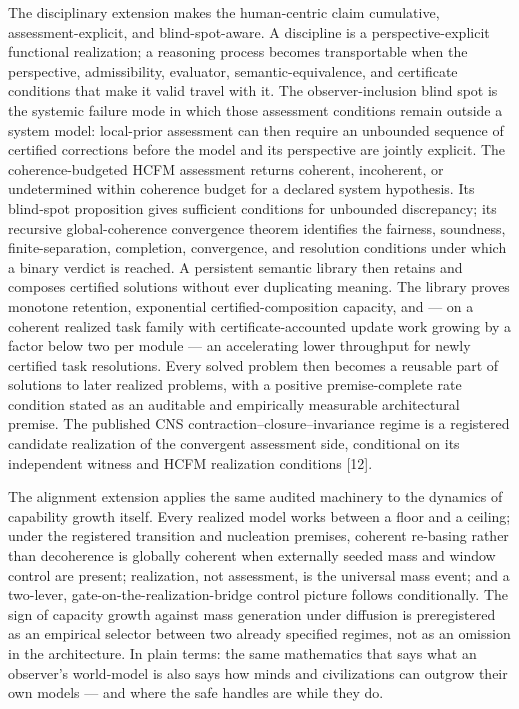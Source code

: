 \documentclass[11pt]{article}
\theoremstyle{definition}
\begin{document}
The disciplinary extension makes the human-centric claim cumulative, assessment-explicit, and blind-spot-aware. A discipline is a perspective-explicit functional realization; a reasoning process becomes transportable when the perspective, admissibility, evaluator, semantic-equivalence, and certificate conditions that make it valid travel with it. The observer-inclusion blind spot is the systemic failure mode in which those assessment conditions remain outside a system model: local-prior assessment can then require an unbounded sequence of certified corrections before the model and its perspective are jointly explicit. The coherence-budgeted HCFM assessment returns coherent, incoherent, or undetermined within coherence budget for a declared system hypothesis. Its blind-spot proposition gives sufficient conditions for unbounded discrepancy; its recursive global-coherence convergence theorem identifies the fairness, soundness, finite-separation, completion, convergence, and resolution conditions under which a binary verdict is reached. A persistent semantic library then retains and composes certified solutions without ever duplicating meaning. The library proves monotone retention, exponential certified-composition capacity, and --- on a coherent realized task family with certificate-accounted update work growing by a factor below two per module --- an accelerating lower throughput for newly certified task resolutions. Every solved problem then becomes a reusable part of solutions to later realized problems, with a positive premise-complete rate condition stated as an auditable and empirically measurable architectural premise. The published CNS contraction--closure--invariance regime is a registered candidate realization of the convergent assessment side, conditional on its independent witness and HCFM realization conditions [12].

The alignment extension applies the same audited machinery to the dynamics of capability growth itself. Every realized model works between a floor and a ceiling; under the registered transition and nucleation premises, coherent re-basing rather than decoherence is globally coherent when externally seeded mass and window control are present; realization, not assessment, is the universal mass event; and a two-lever, gate-on-the-realization-bridge control picture follows conditionally. The sign of capacity growth against mass generation under diffusion is preregistered as an empirical selector between two already specified regimes, not as an omission in the architecture. In plain terms: the same mathematics that says what an observer's world-model is also says how minds and civilizations can outgrow their own models --- and where the safe handles are while they do.
\end{document}
